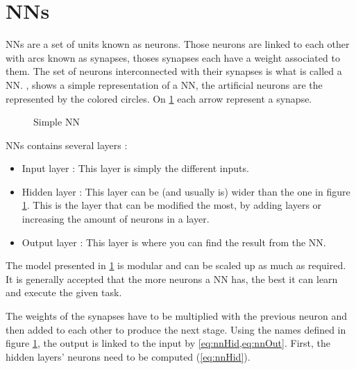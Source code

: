 \section{\aclp{NN}}\label{sec:nn}

\acfp{NN} are a set of units known as neurons. Those neurons are linked to each other with arcs known as synapses, thoses synapses each have a weight associated to them. The set of neurons interconnected with their synapses is what is called a \acl{NN}.
, shows a simple representation of a \ac{NN}, the artificial neurons are the represented by the colored circles. On \cref{fig:snn} each arrow represent a synapse.

\begin{figure}[h!]
  \centering
  
  \caption{Simple \acl{NN}}
  \label{fig:snn}
\end{figure}

\acp{NN} contains several layers :

\begin{itemize}
  \item Input layer : This layer is simply the different inputs.
  \item Hidden layer : This layer can be (and usually is) wider than the one in figure \ref{fig:snn}. This is the layer that can be modified the most, by adding layers or increasing the amount of neurons in a layer.
  \item Output layer : This layer is where you can find the result from the \ac{NN}.
\end{itemize}

The model presented in \cref{fig:snn} is modular and can be scaled up as much as required. It is generally accepted that the more neurons a \ac{NN} has, the best it can learn and execute the given task.

The weights of the synapses have to be multiplied with the previous neuron and then added to each other to produce the next stage. Using the names defined in figure \ref{fig:snn}, the output is linked to the input by \cref{eq:nnHid,eq:nnOut}. First, the hidden layers' neurons need to be computed (\cref{eq:nnHid}).

